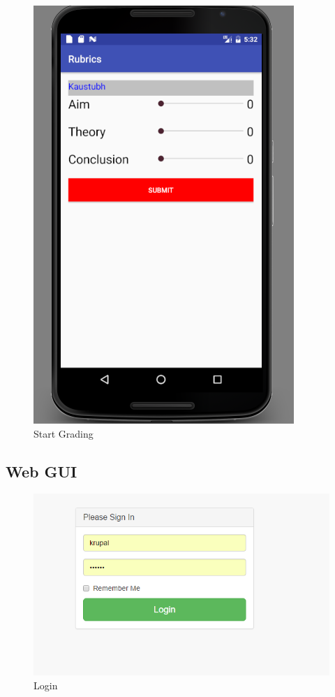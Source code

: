 \begin{figure}[!h]
\begin{minipage}[t]{0.5\linewidth}
    \centering
\hfill\includegraphics[scale=.65]{project/images/gradingnew}\hspace*{\fill}
    \caption{Start Grading}
    \label{f1}
\end{minipage}        
\end{figure}  

\subsection{Web GUI}
\begin{figure}[H]
\begin{minipage}[t]{0.5\linewidth}
    \centering
\hfill\includegraphics[scale=1]{project/11}\hspace*{\fill}
    \caption{Login}
    \label{f1}
\end{minipage}        
\end{figure}  

